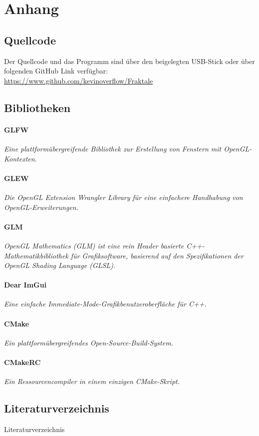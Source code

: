 \titlespacing*{\chapter}{0pt}{-30pt}{20pt}

\chapter{Anhang}
\thispagestyle{fancy} %

\section{Quellcode}
Der Quellcode und das Programm sind über den beigelegten USB-Stick oder über
folgenden GitHub Link verfügbar: \newline
\url{https://www.github.com/kevinoverflow/Fraktale}
\section{Bibliotheken}
\subsubsection*{GLFW}
\textit{Eine plattformübergreifende Bibliothek zur Erstellung von Fenstern mit OpenGL-Kontexten.}
\subsubsection*{GLEW}
\textit{Die OpenGL Extension Wrangler Library für eine einfachere Handhabung von OpenGL-Erweiterungen.}
\subsubsection*{GLM}
\textit{OpenGL Mathematics (GLM) ist eine rein Header basierte C++-Mathematikbibliothek für Grafiksoftware, basierend auf den Spezifikationen der OpenGL Shading Language (GLSL).}
\subsubsection*{Dear ImGui}
\textit{Eine einfache Immediate-Mode-Grafikbenutzeroberfläche für C++.}
\subsubsection*{CMake}
\textit{Ein plattformübergreifendes Open-Source-Build-System.}
\subsubsection*{CMakeRC}
\textit{Ein Ressourcencompiler in einem einzigen CMake-Skript.}

\section{Literaturverzeichnis}
Literaturverzeichnis